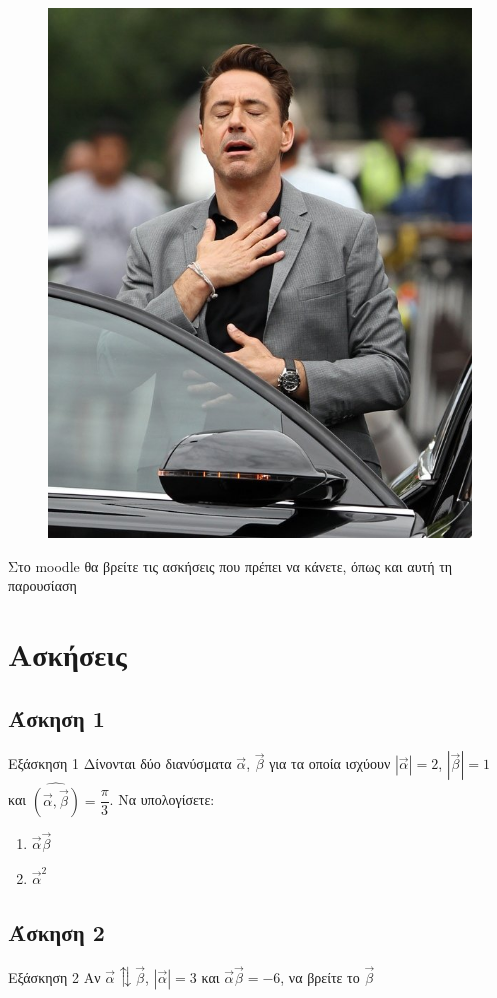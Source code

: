 \documentclass[greek]{beamer}
\begin{document}
\begin{frame}
      \begin{figure}
            \centering
            \includegraphics[width=0.5 \textwidth]{"../images/relief"}
      \end{figure}
\end{frame}

\begin{frame}
      Στο moodle θα βρείτε τις ασκήσεις που πρέπει να κάνετε, όπως και αυτή τη παρουσίαση
\end{frame}

\section{Ασκήσεις}

\subsection{Άσκηση 1}
\begin{frame}[label=Άσκηση1,t]{Εξάσκηση 1}
      Δίνονται δύο διανύσματα $\vec{α}$, $\vec{β}$ για τα οποία ισχύουν $|\vec{α}|=2$, $|\vec{β}|=1$ και $\widehat{(\vec{α }, \vec{β })}=\dfrac{\pi}{3}$. Να υπολογίσετε:
      \begin{enumerate}
            \item<1-> $\vec{α}\vec{β}$
            \item<2-> $\vec{α}^2$
      \end{enumerate}
\end{frame}

\subsection{Άσκηση 2}
\begin{frame}[label=Άσκηση2,t]{Εξάσκηση 2}
      Αν $\vec{α}\updownarrows\vec{β}$, $|\vec{α}|=3$ και $\vec{α}\vec{β}=-6$, να βρείτε το $\vec{β}$
\end{frame}
\end{document}
